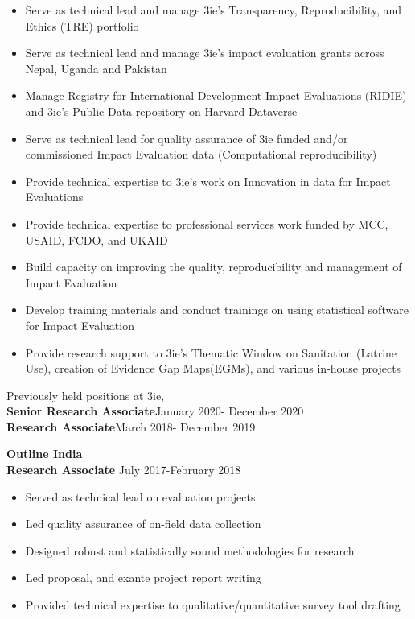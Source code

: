 \documentclass[8pt]{article}
\newenvironment{innerlist}[1][\enskip\textbullet]%
        {\begin{itemize}[#1,leftmargin=*,parsep=0pt,itemsep=0pt,topsep=0pt,partopsep=0pt]}
        {\end{itemize}}
\begin{document}
\begin{innerlist}
\item Serve as technical lead and manage 3ie's Transparency, Reproducibility, and Ethics (TRE) portfolio
\item Serve as technical lead and manage 3ie's impact evaluation grants across Nepal, Uganda and Pakistan
\item Manage Registry for International Development Impact Evaluations (RIDIE) and 3ie's Public Data repository on Harvard Dataverse
\item Serve as technical lead for quality assurance of 3ie funded and/or commissioned Impact Evaluation data (Computational reproducibility)
\item Provide technical expertise to 3ie's work on Innovation in data for Impact Evaluations
\item Provide technical expertise to professional services work funded by MCC, USAID, FCDO, and UKAID
\item Build capacity on improving the quality, reproducibility and management of Impact Evaluation
\item Develop training materials and conduct trainings on using statistical software for Impact Evaluation
\item Provide research support to 3ie's Thematic Window on Sanitation (Latrine Use), creation of Evidence Gap Maps(EGMs), and various in-house projects
\end{innerlist}

\vspace{0.03in}
Previously held positions at 3ie,\\
\textbf{Senior Research Associate}\hfill {January 2020- December 2020}\\
\textbf{Research Associate}\hfill {March 2018- December 2019}\\
\vspace{.03in}


\textbf{Outline India}\\
\textbf{Research Associate} \hfill {July 2017-February 2018}
\vspace{.03in}

\begin{innerlist}
\item Served as technical lead on evaluation projects 
\item Led quality assurance of on-field data collection
\item Designed robust and statistically sound methodologies for research 
\item Led proposal, and exante project report writing
\item Provided technical expertise to qualitative/quantitative survey tool drafting 
\end{innerlist}
\end{document}
